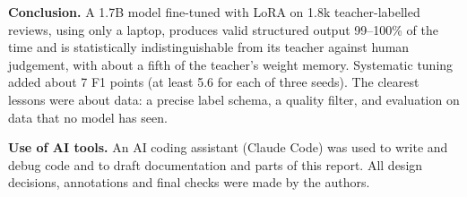 \documentclass[journal]{IEEEtran}
\begin{document}
\textbf{Conclusion.} A 1.7B model fine-tuned with LoRA on 1.8k teacher-labelled reviews, using only a laptop, produces
valid structured output 99--100\% of the time and is statistically indistinguishable from its teacher against human
judgement, with about a fifth of the teacher's weight memory. Systematic tuning added about 7 F1 points (at least 5.6
for each of three seeds). The clearest lessons were about data: a precise label schema, a quality filter, and
evaluation on data that no model has seen.

\textbf{Use of AI tools.} An AI coding assistant (Claude Code) was used to write and debug code and to draft
documentation and parts of this report. All design decisions, annotations and final checks were made by the authors.



\end{document}

